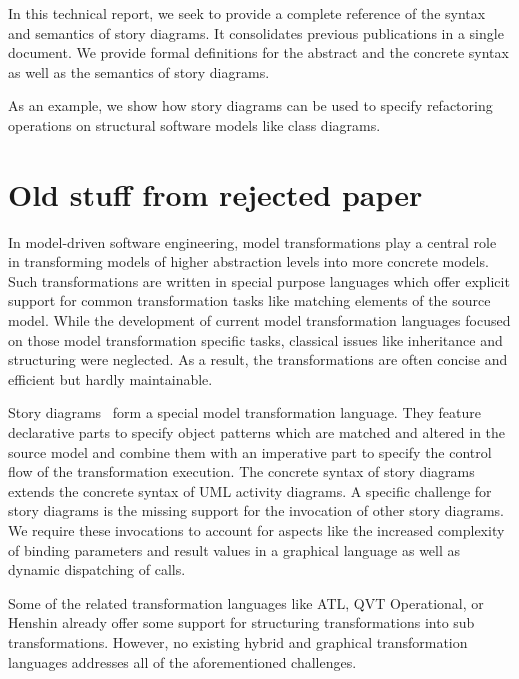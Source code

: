 In this technical report, we seek to provide a complete reference of the syntax and semantics of story diagrams.
It consolidates previous publications in a single document.
We provide formal definitions for the abstract and the concrete syntax as well as the semantics of story diagrams.

As an example, we show how story diagrams can be used to specify refactoring operations on structural software models like class diagrams.




\section*{Old stuff from rejected paper}
In model-driven software engineering, model transformations play a central role in transforming models of higher abstraction levels into more concrete models. 
Such transformations are written in special purpose languages which offer explicit support for common transformation tasks like matching elements of the source model.
While the development of current model transformation languages focused on those model transformation specific tasks, classical issues like inheritance and structuring were neglected.
As a result, the transformations are often concise and efficient but hardly maintainable.

Story diagrams~\cite{ZSW99,FNTZ00,Zun01} form a special model transformation language.
They feature declarative parts to specify object patterns which are matched and altered in the source model and combine them with an imperative part to specify the control flow of the transformation execution.
The concrete syntax of story diagrams extends the concrete syntax of UML activity diagrams.
A specific challenge for story diagrams is the missing support for the invocation of other story diagrams.
We require these invocations to account for aspects like the increased complexity of binding parameters and result values in a graphical language as well as dynamic dispatching of calls.

Some of the related transformation languages like ATL, QVT Operational, or Henshin already offer some support for structuring transformations into sub transformations.
However, no existing hybrid and graphical transformation languages addresses all of the aforementioned challenges. 

